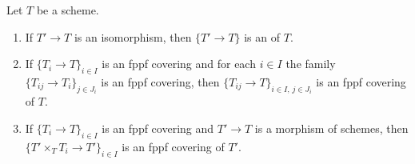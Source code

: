 \begin{lemma}
\label{lem:pc-fppf-covering-stability}
Let $T$ be a scheme.
\begin{enumerate}
\item If $T'\to T$ is an isomorphism, then $\{T'\to T\}$ is an
 of $T$.
\item If $\{T_i\to T\}_{i\in I}$ is an fppf covering and for each $i\in I$
the family $\{T_{ij}\to T_i\}_{j\in J_i}$ is an fppf covering, then
$\{T_{ij}\to T\}_{i\in I,\,j\in J_i}$ is an fppf covering of $T$.
\item If $\{T_i\to T\}_{i\in I}$ is an fppf covering and $T'\to T$ is a
morphism of schemes, then $\{T'\times_TT_i\to T'\}_{i\in I}$ is an fppf
covering of $T'$.
\end{enumerate}

\end{lemma}

